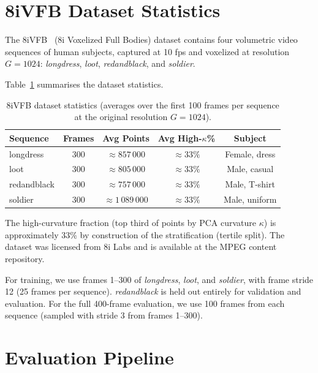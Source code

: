 \section{8iVFB Dataset Statistics}
\label{app:dataset}

The 8iVFB~\cite{8ivfb} (8i Voxelized Full Bodies) dataset contains
four volumetric video sequences of human subjects, captured at 10 fps
and voxelized at resolution $G = 1024$:
\textit{longdress}, \textit{loot}, \textit{redandblack}, and \textit{soldier}.

Table~\ref{tab:dataset-stats} summarises the dataset statistics.

\begin{table}[h]
  \centering
  \caption{%
    8iVFB dataset statistics (averages over the first 100 frames per sequence
    at the original resolution $G = 1024$).
  }
  \label{tab:dataset-stats}
  \small
  \begin{tabular}{lcccc}
    \toprule
    \textbf{Sequence} & \textbf{Frames} &
    \textbf{Avg Points} & \textbf{Avg High-$\kappa$\%} & \textbf{Subject} \\
    \midrule
    longdress   & 300 & $\approx 857\,000$ & $\approx 33\%$ & Female, dress \\
    loot        & 300 & $\approx 805\,000$ & $\approx 33\%$ & Male, casual \\
    redandblack & 300 & $\approx 757\,000$ & $\approx 33\%$ & Male, T-shirt \\
    soldier     & 300 & $\approx 1\,089\,000$ & $\approx 33\%$ & Male, uniform \\
    \bottomrule
  \end{tabular}
\end{table}

The high-curvature fraction (top third of points by PCA curvature $\kappa$)
is approximately 33\% by construction of the stratification (tertile split).
The dataset was licensed from 8i Labs and is available at the MPEG content
repository.

For training, we use frames 1--300 of \textit{longdress}, \textit{loot},
and \textit{soldier}, with frame stride 12 (25 frames per sequence).
\textit{redandblack} is held out entirely for validation and evaluation.
For the full 400-frame evaluation, we use 100 frames from each sequence
(sampled with stride 3 from frames 1--300).

\section{Evaluation Pipeline}
\label{app:eval-pipeline}

